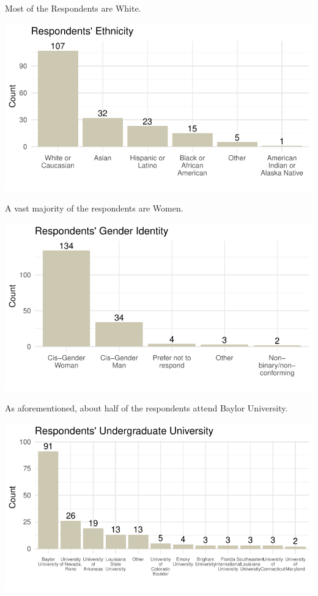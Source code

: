 \documentclass[
  letterpaper,
  DIV=11,
  numbers=noendperiod]{scrartcl}
\begin{document}
Most of the Respondents are White.

\includegraphics{GlobalHealthQuartoHC_files/figure-pdf/unnamed-chunk-6-1.pdf}

\newpage

A vast majority of the respondents are Women.

\includegraphics{GlobalHealthQuartoHC_files/figure-pdf/unnamed-chunk-7-1.pdf}

As aforementioned, about half of the respondents attend Baylor
University.

\includegraphics{GlobalHealthQuartoHC_files/figure-pdf/unnamed-chunk-8-1.pdf}
\end{document}
